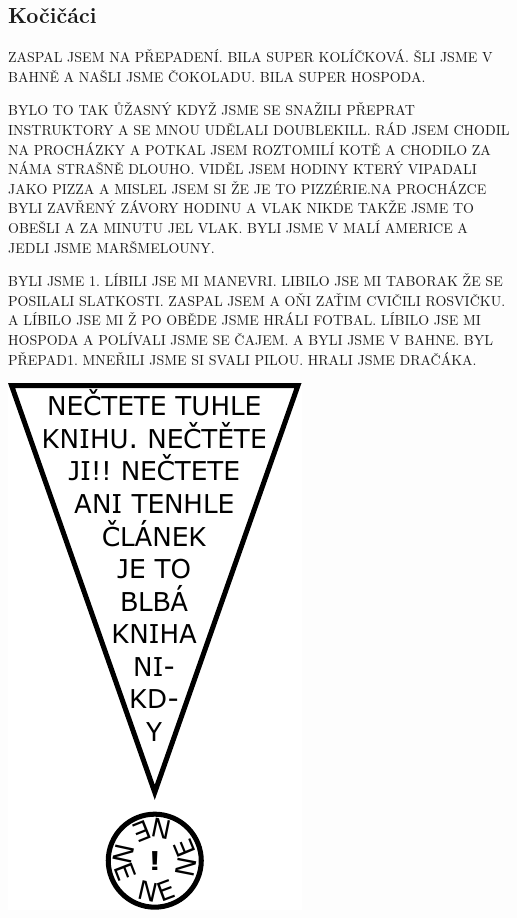 \subsection*{Kočičáci} %
\label{sub:kočičáci}

\begin{multicols}{2}

ZASPAL JSEM NA PŘEPADENÍ. BILA SUPER KOLÍČKOVÁ. ŠLI JSME V BAHNĚ A NAŠLI JSME ČOKOLADU. BILA SUPER HOSPODA.





BYLO TO TAK ŮŽASNÝ KDYŽ JSME SE SNAŽILI PŘEPRAT INSTRUKTORY A SE MNOU UDĚLALI DOUBLEKILL. RÁD JSEM CHODIL NA PROCHÁZKY A POTKAL JSEM ROZTOMILÍ KOTĚ A CHODILO ZA NÁMA STRAŠNĚ DLOUHO. VIDĚL JSEM HODINY KTERÝ VIPADALI JAKO PIZZA A MISLEL JSEM SI ŽE JE TO PIZZÉRIE.NA PROCHÁZCE BYLI ZAVŘENÝ ZÁVORY HODINU A VLAK NIKDE TAKŽE JSME TO OBEŠLI A ZA MINUTU JEL VLAK. BYLI JSME V MALÍ AMERICE A JEDLI JSME MARŠMELOUNY.




BYLI JSME 1. LÍBILI JSE MI MANEVRI. LIBILO JSE MI TABORAK ŽE SE POSILALI SLATKOSTI. ZASPAL JSEM A OŇI ZAŤIM CVIČILI ROSVIČKU. A LÍBILO JSE MI Ž PO OBĚDE JSME HRÁLI FOTBAL. LÍBILO JSE MI HOSPODA A POLÍVALI JSME SE ČAJEM. A BYLI JSME V BAHNE. BYL PŘEPAD1. MNEŘILI JSME SI SVALI PILOU. HRALI JSME DRAČÁKA.


\columnbreak

\includegraphics{prispevky_deti/paradox.pdf}


\end{multicols}
